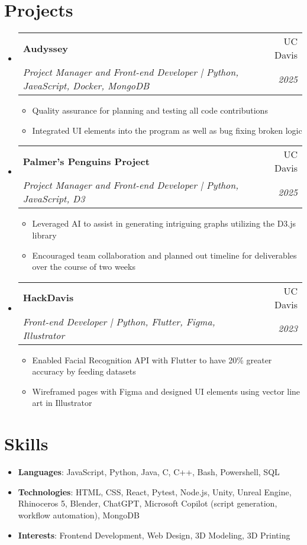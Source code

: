\documentclass[letterpaper,11pt]{article}
\makeatletter
\newcommand{\resumeSubheading}[4]{
  \vspace{-1pt}\item
    \begin{tabular*}{0.97\textwidth}[t]{l@{\extracolsep{\fill}}r}
      \textbf{#1} & #2 \\
      \textit{\small#3} & \textit{\small #4} \\
    \end{tabular*}\vspace{-5pt}
}
\newcommand{\resumeSubHeadingListStart}{\begin{itemize}[leftmargin=*]}
\newcommand{\resumeSubHeadingListEnd}{\end{itemize}}
\newcommand{\resumeItemListStart}{\begin{itemize}}
\newcommand{\resumeItemListEnd}{\end{itemize}\vspace{-5pt}}
\makeatother
\begin{document}
\section{Projects}
\resumeSubHeadingListStart
    \resumeSubheading
        {Audyssey}{UC Davis}
        {Project Manager and Front-end Developer | Python, JavaScript, Docker, MongoDB}{2025}
        \resumeItemListStart
            \begin{itemize}
                \item Quality assurance for planning and testing all code contributions
                \item Integrated UI elements into the program as well as bug fixing broken logic
            \end{itemize}
        \resumeItemListEnd
    \resumeSubheading
        {Palmer's Penguins Project}{UC Davis}
        {Project Manager and Front-end Developer | Python, JavaScript, D3}{2025}
        \resumeItemListStart
            \begin{itemize}
                \item Leveraged AI to assist in generating intriguing graphs utilizing the D3.js library
                \item Encouraged team collaboration and planned out timeline for deliverables over the course of two weeks
            \end{itemize}
        \resumeItemListEnd
    \resumeSubheading
        {HackDavis}{UC Davis}
        {Front-end Developer | Python, Flutter, Figma, Illustrator}{2023}
        \resumeItemListStart
            \begin{itemize}
                \item Enabled Facial Recognition API with Flutter to have 20\% greater accuracy by feeding datasets
                \item Wireframed pages with Figma and designed UI elements using vector line art in Illustrator
            \end{itemize}
        \resumeItemListEnd
\resumeSubHeadingListEnd

%
\section{Skills}
    \resumeSubHeadingListStart
        \item{
            \textbf{Languages}{: JavaScript, Python, Java, C, C++, Bash, Powershell, SQL}
        }
        \item{
            \textbf{Technologies}{: HTML, CSS, React, Pytest, Node.js, Unity, Unreal Engine, Rhinoceros 5, Blender, ChatGPT, Microsoft Copilot (script generation, workflow automation), MongoDB}
        }
        \item{
            \textbf{Interests}{: Frontend Development, Web Design, 3D Modeling, 3D Printing}
        }
    \resumeSubHeadingListEnd

\end{document}
